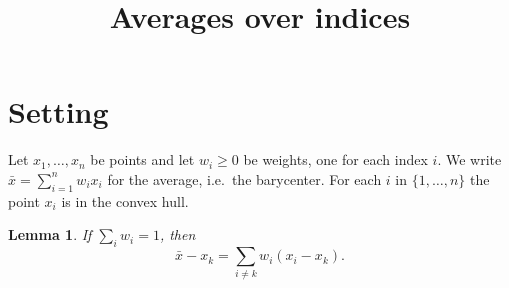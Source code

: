 \documentclass{amsart}
\newtheorem{lemma}{Lemma}
\begin{document}
\title{Averages over indices}
\maketitle

\section{Setting}
Let $x_1, \dots, x_n$ be points and let $w_i \geq 0$ be weights, one for each index $i$.
We write $\bar{x} = \sum_{i=1}^n w_i x_i$ for the average, i.e.\ the barycenter.
For each $i$ in $\{1, \dots, n\}$ the point $x_i$ is in the convex hull.

\begin{lemma}\label{lem:convex}
If $\sum_i w_i = 1$, then
\begin{equation}
  \bar{x} - x_k = \sum_{i \neq k} w_i (x_i - x_k).
\end{equation}
\end{lemma}


\end{document}
